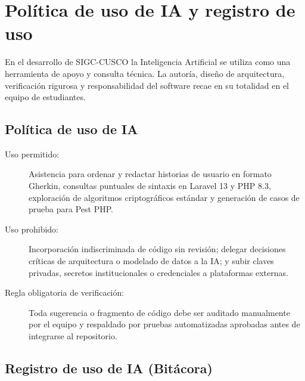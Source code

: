 \section{Política de uso de IA y registro de uso}

En el desarrollo de SIGC-CUSCO la Inteligencia Artificial se utiliza como una herramienta de apoyo y consulta técnica. La autoría, diseño de arquitectura, verificación rigurosa y responsabilidad del software recae en su totalidad en el equipo de estudiantes.

\subsection{Política de uso de IA}

\begin{description}
    \item[Uso permitido:] Asistencia para ordenar y redactar historias de usuario en formato Gherkin, consultas puntuales de sintaxis en Laravel 13 y PHP 8.3, exploración de algoritmos criptográficos estándar y generación de casos de prueba para Pest PHP.
    \item[Uso prohibido:] Incorporación indiscriminada de código sin revisión; delegar decisiones críticas de arquitectura o modelado de datos a la IA; y subir claves privadas, secretos institucionales o credenciales a plataformas externas.
    \item[Regla obligatoria de verificación:] Toda sugerencia o fragmento de código debe ser auditado manualmente por el equipo y respaldado por pruebas automatizadas aprobadas antes de integrarse al repositorio.
\end{description}

\subsection{Registro de uso de IA (Bitácora)}

